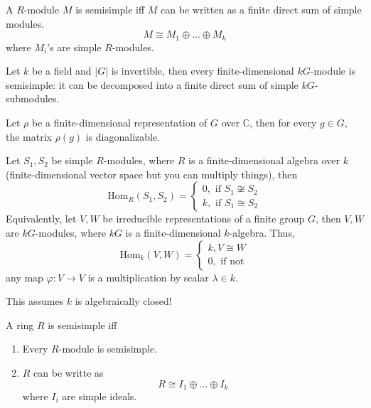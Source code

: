 \documentclass[openany]{book}
\newcommand{\C}{\mathbb{C}}
\begin{document}
\begin{defn}[semisimple]
    A $R$-module $M$ is semisimple iff $M$ can be written as a finite direct sum of simple modules.
    \begin{equation*}
        M\cong M_1\oplus \dots\oplus M_k
    \end{equation*}
    where $M_i$'s are simple $R$-modules.
\end{defn}

\begin{prop}
    Let $k$ be a field and $|G|$ is invertible, then every finite-dimensional $kG$-module is semisimple: it can be decomposed into a finite direct sum of simple $kG$-submodules.
\end{prop}

\begin{prop}
    Let $\rho$ be a finite-dimensional representation of $G$ over $\C$, then for every $g\in G$, the matrix $\rho(g)$ is diagonalizable.
\end{prop}

\begin{prop}
    Let $S_1,S_2$ be simple $R$-modules, where $R$ is a finite-dimensional algebra over $k$ (finite-dimensional vector space but you can multiply things), then 
    \begin{equation*}
        \text{Hom}_R(S_1,S_2)=\begin{cases}
            0, \text{ if } S_1\not\cong S_2\\
            k, \text{ if } S_1\cong S_2
        \end{cases}
    \end{equation*}
    Equivalently, let $V,W$ be irreducible representations of a finite group $G$, then $V,W$ are $kG$-modules, where $kG$ is a finite-dimensional $k$-algebra. Thus,
    \begin{equation*}
        \text{Hom}_k(V,W)=\begin{cases}
            k, V\cong W\\
            0, \text{ if not}
        \end{cases}
    \end{equation*}
    any map $\varphi:V\to V$ is a multiplication by scalar $\lambda\in k$. 
    \begin{warn}
        This assumes $k$ is algebraically closed!
    \end{warn}
\end{prop}


\begin{defn}
    A ring $R$ is semisimple iff 
    \begin{enumerate}
        \item Every $R$-module is semisimple.
        \item $R$ can be writte as 
        \begin{equation*}
            R\cong I_1\oplus\dots\oplus I_k
        \end{equation*}
        where $I_i$ are simple ideals.
    \end{enumerate}
\end{defn}
\end{document}
